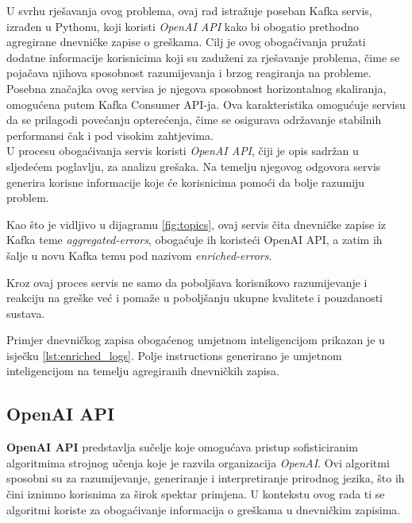 \documentclass[times, utf8, diplomski]{fer}
\begin{document}
U svrhu rješavanja ovog problema, ovaj rad istražuje poseban Kafka servis, izrađen u Pythonu, koji koristi \emph{OpenAI API} kako bi obogatio prethodno agregirane dnevničke zapise o greškama. Cilj je ovog obogaćivanja pružati dodatne informacije korisnicima koji su zaduženi za rješavanje problema, čime se pojačava njihova sposobnost razumijevanja i brzog reagiranja na probleme.\\

Posebna značajka ovog servisa je njegova sposobnost horizontalnog skaliranja, omogućena putem Kafka Consumer API-ja. Ova karakteristika omogućuje servisu da se prilagodi povećanju opterećenja, čime se osigurava održavanje stabilnih performansi čak i pod visokim zahtjevima.\\

U procesu obogaćivanja servis koristi \emph{OpenAI API}, čiji je opis sadržan u sljedećem poglavlju, za analizu grešaka. Na temelju njegovog odgovora servis generira korisne informacije koje će korisnicima pomoći da bolje razumiju problem.

Kao što je vidljivo u dijagramu \ref{fig:topics}, ovaj servis čita dnevničke zapise iz Kafka teme \glqq \emph{aggregated-errors}\grqq, obogaćuje ih koristeći OpenAI API, a zatim ih šalje u novu Kafka temu pod nazivom \glqq \emph{enriched-errors}\grqq.

Kroz ovaj proces servis ne samo da poboljšava korisnikovo razumijevanje i reakciju na greške već i pomaže u poboljšanju ukupne kvalitete i pouzdanosti sustava. 

Primjer dnevničkog zapisa obogaćenog umjetnom inteligencijom prikazan je u isječku \ref{lst:enriched_logs}. Polje \glqq instructions\grqq\hspace{1pt} generirano je umjetnom inteligencijom na temelju agregiranih dnevničkih zapisa.

\subsection{OpenAI API}
\label{sec:openai}

\textbf{OpenAI API} predstavlja sučelje koje omogućava pristup sofisticiranim algoritmima strojnog učenja koje je razvila organizacija \emph{OpenAI}. Ovi algoritmi sposobni su za razumijevanje, generiranje i interpretiranje prirodnog jezika, što ih čini iznimno korisnima za širok spektar primjena. U kontekstu ovog rada ti se algoritmi koriste za obogaćivanje informacija o greškama u dnevničkim zapisima.\\
\end{document}
